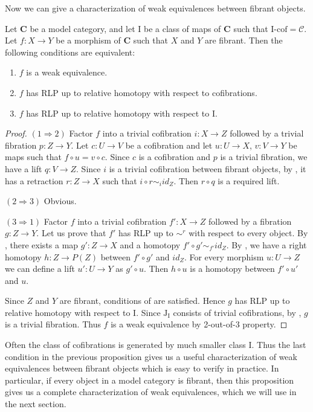 \documentclass{tac}
\theoremstyle{definition}
\newcommand{\cof}{\mathcal{C}}
\newcommand{\cat}[1]{\mathbf{#1}}
\newcommand{\C}{\cat{C}}
\newcommand{\I}{\mathrm{I}}
\newcommand{\J}{\mathrm{J}}
\newcommand{\class}[2]{#1\text{-}\mathrm{#2}}
\newcommand{\Icof}[1][\I]{\class{#1}{cof}}
\begin{document}
Now we can give a characterization of weak equivalences between fibrant objects.

\begin{prop}[min-we]
Let $\C$ be a model category, and let $\I$ be a class of maps of $\C$ such that $\Icof = \cof$.
Let $f : X \to Y$ be a morphism of $\C$ such that $X$ and $Y$ are fibrant.
Then the following conditions are equivalent:
\begin{enumerate}
\item $f$ is a weak equivalence.
\item $f$ has RLP up to relative homotopy with respect to cofibrations.
\item $f$ has RLP up to relative homotopy with respect to $\I$.
\end{enumerate}
\end{prop}
\begin{proof}
$(1 \Rightarrow 2)$
Factor $f$ into a trivial cofibration $i : X \to Z$ followed by a trivial fibration $p : Z \to Y$.
Let $c : U \to V$ be a cofibration and let $u : U \to X$, $v : V \to Y$ be maps such that $f \circ u = v \circ c$.
Since $c$ is a cofibration and $p$ is a trivial fibration, we have a lift $q : V \to Z$.
Since $i$ is a trivial cofibration between fibrant objects, by , it has a retraction $r : Z \to X$ such that $i \circ r \sim_i id_Z$.
Then $r \circ q$ is a required lift.

$(2 \Rightarrow 3)$ Obvious.

$(3 \Rightarrow 1)$
Factor $f$ into a trivial cofibration $f' : X \to Z$ followed by a fibration $g : Z \to Y$.
Let us prove that $f'$ has RLP up to $\sim^r$ with respect to every object.
By , there exists a map $g' : Z \to X$ and a homotopy $f' \circ g' \sim_{f'} id_Z$.
By , we have a right homotopy $h : Z \to P(Z)$ between $f' \circ g'$ and $id_Z$.
For every morphism $u : U \to Z$ we can define a lift $u' : U \to Y$ as $g' \circ u$.
Then $h \circ u$ is a homotopy between $f' \circ u'$ and $u$.

Since $Z$ and $Y$ are fibrant, conditions of  are satisfied.
Hence $g$ has RLP up to relative homotopy with respect to $\I$.
Since $\J_\I$ consists of trivial cofibrations, by , $g$ is a trivial fibration.
Thus $f$ is a weak equivalence by 2-out-of-3 property.
\end{proof}

Often the class of cofibrations is generated by much smaller class $\I$.
Thus the last condition in the previous proposition gives us a useful characterization of weak equivalences between fibrant objects which is easy to verify in practice.
In particular, if every object in a model category is fibrant, then this proposition gives us a complete characterization of weak equivalences, which we will use in the next section.
\end{document}
